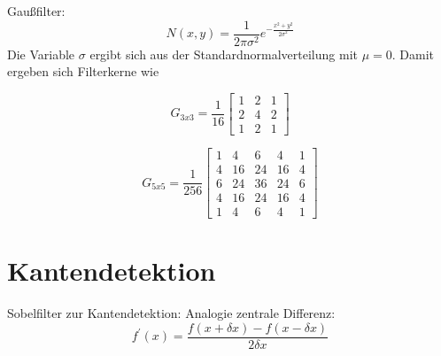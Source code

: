 Gau\ss{}filter:
\begin{equation}
 N(x, y) = \frac{1}{2\pi\sigma^2} e^{-\frac{x^2+y^2}{2\sigma^2}}
\end{equation}
Die Variable \( \sigma \) ergibt sich aus der Standardnormalverteilung mit \( \mu=0 \). Damit ergeben sich Filterkerne wie
\begin{multicols}{2}

\begin{equation*}
 G_{3x3}=\frac{1}{16} \begin{bmatrix} 1&2&1 \\ 2&4&2 \\ 1&2&1 \end{bmatrix}
\end{equation*}
 
 \columnbreak
 \begin{equation*}
 G_{5x5}=\frac{1}{256} \begin{bmatrix} 1&4&6&4&1 \\ 4&16&24&16&4 \\ 6&24&36&24&6 \\ 4&16&24&16&4 \\ 1&4&6&4&1 \end{bmatrix}
\end{equation*}
 
\end{multicols}

\section{Kantendetektion}

Sobelfilter zur Kantendetektion:
Analogie zentrale Differenz:
\begin{equation*}
 f^\prime (x)=\frac{f(x+\delta x)-f(x-\delta x)}{2\delta x}
\end{equation*}

